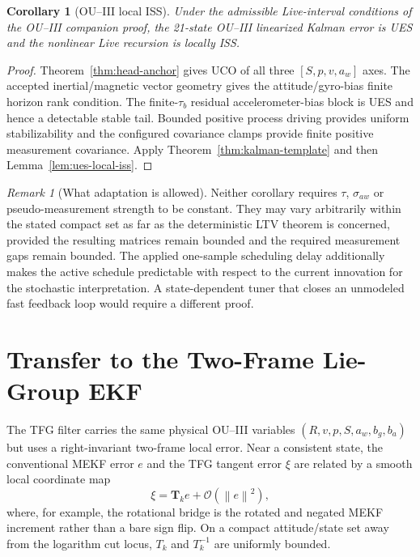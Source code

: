 \documentclass[conference]{IEEEtran}
\DeclareRobustCommand{\mat}[1]{\bm{#1}}
\newcommand{\norm}[1]{\left\lVert#1\right\rVert}
\newtheorem{corollary}{Corollary}
\theoremstyle{remark}
\newtheorem{remark}{Remark}
\begin{document}
\begin{corollary}[OU--III local ISS]
\label{cor:ou3}
Under the admissible Live-interval conditions of the OU--III companion proof,
the 21-state OU--III linearized Kalman error is UES and the nonlinear Live
recursion is locally ISS.
\end{corollary}

\begin{proof}
Theorem~\ref{thm:head-anchor} gives UCO of all three $[S,p,v,a_w]$ axes.  The
accepted inertial/magnetic vector geometry gives the attitude/gyro-bias finite
horizon rank condition.  The finite-$\tau_b$ residual accelerometer-bias block
is UES and hence a detectable stable tail.  Bounded positive process driving
provides uniform stabilizability and the configured covariance clamps provide
finite positive measurement covariance.  Apply
Theorem~\ref{thm:kalman-template} and then Lemma~\ref{lem:ues-local-iss}.
\end{proof}

\begin{remark}[What adaptation is allowed]
Neither corollary requires $\tau$, $\sigma_{aw}$ or pseudo-measurement strength
to be constant.  They may vary arbitrarily within the stated compact set as far
as the deterministic LTV theorem is concerned, provided the resulting matrices
remain bounded and the required measurement gaps remain bounded.  The applied
one-sample scheduling delay additionally makes the active schedule predictable
with respect to the current innovation for the stochastic interpretation.  A
state-dependent tuner that closes an unmodeled fast feedback loop would require
a different proof.
\end{remark}

\section{Transfer to the Two-Frame Lie-Group EKF}
\label{sec:tfg}

The TFG filter carries the same physical OU--III variables
$(R,v,p,S,a_w,b_g,b_a)$ but uses a right-invariant two-frame local error.
Near a consistent state, the conventional MEKF error $e$ and the TFG tangent
error $\xi$ are related by a smooth local coordinate map
\begin{equation}
 \xi=\mat T_k e+\mathcal O(\norm e^2),
 \label{eq:tfg-local-map}
\end{equation}
where, for example, the rotational bridge is the rotated and negated MEKF
increment rather than a bare sign flip.  On a compact attitude/state set away
from the logarithm cut locus, $T_k$ and $T_k^{-1}$ are uniformly bounded.
\end{document}
